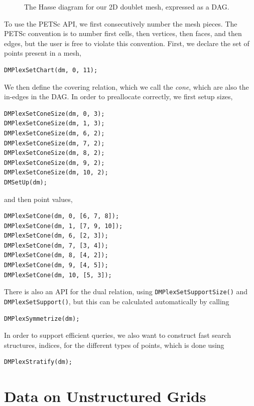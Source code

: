 {\begin{figure}
\caption{The Hasse diagram for our 2D doublet mesh, expressed as a DAG.}
\label{fig:doubletSieve}
\end{figure}
To use the PETSc API, we first consecutively number the mesh pieces. The PETSc convention is to number first cells,
then vertices, then faces, and then edges, but the user is free to violate this convention. First, we declare the set of
points present in a mesh,
\begin{lstlisting}
DMPlexSetChart(dm, 0, 11);
\end{lstlisting}
We then define the covering relation, which we call the \textit{cone}, which are also the in-edges in the DAG. In order
to preallocate correctly, we first setup sizes,
\begin{lstlisting}
DMPlexSetConeSize(dm, 0, 3);
DMPlexSetConeSize(dm, 1, 3);
DMPlexSetConeSize(dm, 6, 2);
DMPlexSetConeSize(dm, 7, 2);
DMPlexSetConeSize(dm, 8, 2);
DMPlexSetConeSize(dm, 9, 2);
DMPlexSetConeSize(dm, 10, 2);
DMSetUp(dm);
\end{lstlisting}
and then point values,
\begin{lstlisting}
DMPlexSetCone(dm, 0, [6, 7, 8]);
DMPlexSetCone(dm, 1, [7, 9, 10]);
DMPlexSetCone(dm, 6, [2, 3]);
DMPlexSetCone(dm, 7, [3, 4]);
DMPlexSetCone(dm, 8, [4, 2]);
DMPlexSetCone(dm, 9, [4, 5]);
DMPlexSetCone(dm, 10, [5, 3]);
\end{lstlisting}

There is also an API for the dual relation, using \lstinline{DMPlexSetSupportSize()} and \break\lstinline{DMPlexSetSupport()}, but this can be
calculated automatically by calling
\begin{lstlisting}
DMPlexSymmetrize(dm);
\end{lstlisting}
In order to support efficient queries, we also want to construct fast search structures, indices, for the different
types of points, which is done using
\begin{lstlisting}
DMPlexStratify(dm);
\end{lstlisting}

\section{Data on Unstructured Grids} 

}
